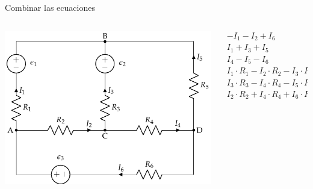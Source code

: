 \documentclass[aspectratio=169, xcolor={usenames,svgnames,dvipsnames}]{beamer}
\begin{document}
\begin{frame}{Combinar las ecuaciones}
\begin{columns}
\begin{column}{0.5\columnwidth}
\begin{center}
\includegraphics[width=.9\linewidth]{../figs/mallas1.pdf}
\end{center}
\end{column}

\begin{column}{0.5\columnwidth}
\begin{align*}
  - I_1 -  I_2 + I_6  &= 0\\
  I_1 + I_3 + I_5 &= 0\\
  I_4 - I_5 - I_6 &= 0\\
  I_1 \cdot R_1 - I_2 \cdot R_2 - I_3 \cdot R_3 &= \epsilon_1 - \epsilon_2\\
  I_3 \cdot R_3 - I_4 \cdot R_4 -I_5 \cdot R_5 &= \epsilon_2\\
  I_2 \cdot R_2 + I_4 \cdot R_4 + I_6 \cdot R_6 &= \epsilon_3
\end{align*}
\end{column}
\end{columns}
\end{frame}
\end{document}
